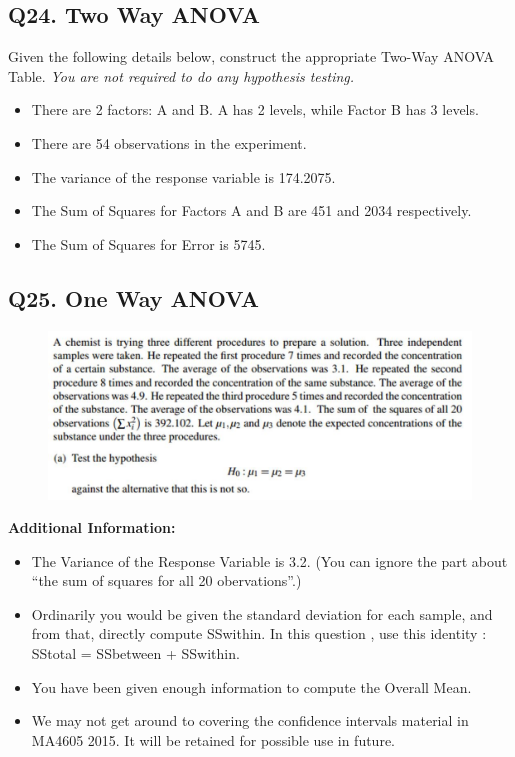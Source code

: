 \documentclass[a4paper,12pt]{article}
\begin{document}
\newpage
\subsection*{Q24. Two Way ANOVA }
Given the following details below, construct the appropriate Two-Way ANOVA Table. \textit{You are not required to do any hypothesis testing.}

\begin{itemize}
	\item There are 2 factors: A and B. A has 2 levels, while Factor B has 3 levels.
	\item There are 54 observations in the experiment.
	\item The variance of the response variable is 174.2075.
	\item The Sum of Squares for Factors A and B are 451  and  2034 respectively.
	\item The Sum of Squares for Error is 5745.
\end{itemize}


\newpage

\subsection*{Q25. One Way ANOVA }
\begin{figure}[h!]
	\centering
	\includegraphics[width=0.7\linewidth]{images/Q24review1}
	
\end{figure}

\noindent \textbf{Additional Information: }
\begin{itemize}
	\item The Variance of the Response Variable is 3.2. (You can ignore the part about “the sum of squares for all 20 obervations”.)
	\item  Ordinarily you would be given the standard deviation for each sample, and from that, directly compute SSwithin. In this question , use this identity : SStotal = SSbetween + SSwithin.
	\item  You have been given enough information to compute the Overall Mean.
	\item  We may not get around to covering the confidence intervals material in MA4605 2015. It will be retained for possible use in future.
\end{itemize}
\newpage
\end{document}
